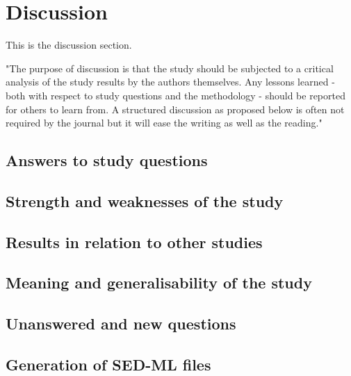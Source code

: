 \section*{Discussion} 
This is the discussion section.

"The purpose of discussion is that the study should be subjected to a critical analysis of the study results
by the authors themselves. Any lessons learned - both with respect to study questions and the
methodology - should be reported for others to learn from.
A structured discussion as proposed below is often not required by the journal but it will ease the
writing as well as the reading."  


\subsection*{Answers to study questions}

\subsection*{Strength and weaknesses of the study}

\subsection*{Results in relation to other studies}

\subsection*{Meaning and generalisability of the study}

\subsection*{Unanswered and new questions}


\subsection{Generation of SED-ML files}


